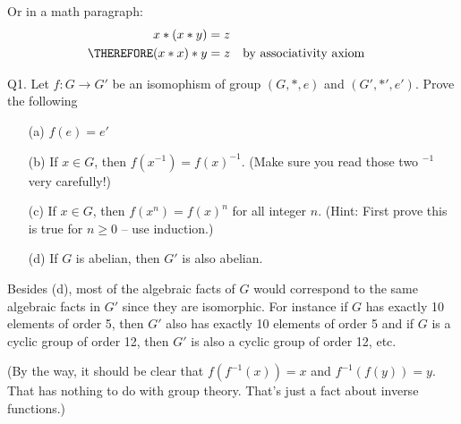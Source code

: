 Or in a math paragraph:
\begin{align*}
           x * (x * y) &= z     \\
\THEREFORE (x * x)* y  &= z & & \text{by associativity axiom}
\end{align*}

\newpage
Q1. Let $f : G \rightarrow G'$ be an isomophism of group
$(G, *, e)$ and $(G', *', e')$. Prove the following
\begin{enumerate}[nosep]
\item[(a)] $f(e) = e'$
\item[(b)] If $x \in G$, then $f(x^{-1}) = f(x)^{-1}$. (Make sure you read
those two ${}^{-1}$ very carefully!)
\item[(c)] If $x \in G$, then $f(x^n) = f(x)^n$ for all integer $n$.
(Hint: First prove this is true for $n \geq 0$ -- use induction.)
\item[(d)] If $G$ is abelian, then $G'$ is also abelian.
\end{enumerate}

Besides (d), most of the algebraic facts of $G$ would correspond to the same
algebraic facts in $G'$ since they are isomorphic.
For instance if $G$ has exactly 10 elements of order 5, then $G'$
also has exactly 10 elements of order 5 and
if $G$ is a cyclic group of order 12,
then $G'$ is also a cyclic group of order 12, etc.  

(By the way, it should be clear that $f(f^{-1}(x)) = x$ and $f^{-1}(f(y)) = y$.
That has nothing to do with group theory.
That's just a fact about inverse functions.)

\SOLUTION



